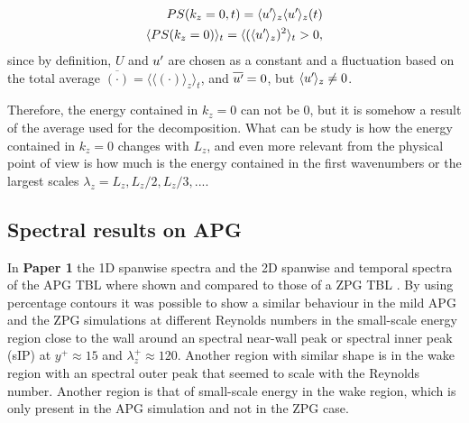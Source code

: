 \begin{equation}
\begin{split}
     PS(k_z=0,t) = \langle u^{\prime}\mkern-1.2mu \rangle_z \langle u^{\prime}\mkern-1.2mu \rangle_z  (t) \\
     \langle PS(k_z=0) \rangle_t = \langle (\langle u^{\prime}\mkern-1.2mu \rangle_z)^2 \rangle_t > 0,
\end{split}
\end{equation}
since by definition, $U$ and $u^{\prime}\mkern-1.2mu$ are chosen as a constant and a fluctuation based on the total average $\overline{( \cdot )} = \langle \langle ( \cdot ) \rangle_z \rangle_t$, and $\overline{u^{\prime}\mkern-1.2mu}=0$, but $ \langle u^{\prime}\mkern-1.2mu \rangle_z \neq 0$.

Therefore, the energy contained in $k_z=0$ can not be 0, but it is somehow a result of the average used for the decomposition.
What can be study is how the energy contained in $k_z=0$ changes with $L_z$, and even more relevant from the physical point of view is how much is the energy contained in the first wavenumbers or the largest scales $\lambda_z=L_z, L_z/2, L_z/3,...$.


\subsection{Spectral results on APG}

In \textbf{Paper 1} the 1D spanwise spectra and the 2D spanwise and temporal spectra of the APG TBL where shown and compared to those of a ZPG TBL \citep{EAmorZPG}. By using percentage contours it was possible to show a similar behaviour in the mild APG and the ZPG simulations at different Reynolds numbers in the small-scale energy region close to the wall around an spectral near-wall peak or spectral inner peak (sIP) at $y^+\approx 15$ and $\lambda_z^+\approx 120$. Another region with similar shape is in the wake region with an spectral outer peak that seemed to scale with the Reynolds number.
Another region is that of small-scale energy in the wake region, which is only present in the APG simulation and not in the ZPG case.

